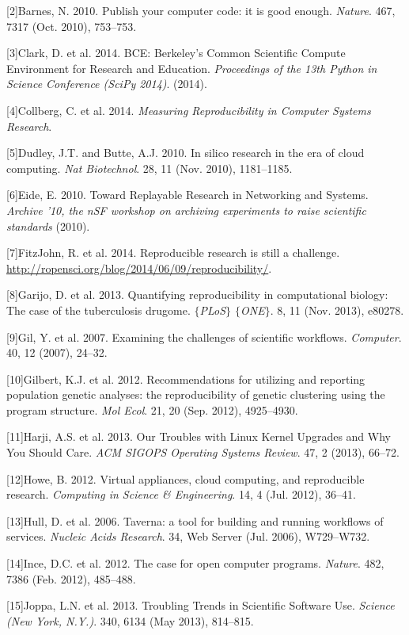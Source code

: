 \documentclass[9pt]{components/acm_proc_article-sp}
\begin{document}
{[}2{]}Barnes, N. 2010. Publish your computer code: it is good enough.
\emph{Nature}. 467, 7317 (Oct. 2010), 753--753.

{[}3{]}Clark, D. et al. 2014. BCE: Berkeley's Common Scientific Compute
Environment for Research and Education. \emph{Proceedings of the 13th
Python in Science Conference (SciPy 2014)}. (2014).

{[}4{]}Collberg, C. et al. 2014. \emph{Measuring Reproducibility in
Computer Systems Research}.

{[}5{]}Dudley, J.T. and Butte, A.J. 2010. In silico research in the era
of cloud computing. \emph{Nat Biotechnol}. 28, 11 (Nov. 2010),
1181--1185.

{[}6{]}Eide, E. 2010. Toward Replayable Research in Networking and
Systems. \emph{Archive '10, the nSF workshop on archiving experiments to
raise scientific standards} (2010).

{[}7{]}FitzJohn, R. et al. 2014. Reproducible research is still a
challenge. \url{http://ropensci.org/blog/2014/06/09/reproducibility/}.

{[}8{]}Garijo, D. et al. 2013. Quantifying reproducibility in
computational biology: The case of the tuberculosis drugome.
\emph{\(\lbrace\)PLoS\(\rbrace\) \(\lbrace\)ONE\(\rbrace\)}. 8, 11 (Nov.
2013), e80278.

{[}9{]}Gil, Y. et al. 2007. Examining the challenges of scientific
workflows. \emph{Computer}. 40, 12 (2007), 24--32.

{[}10{]}Gilbert, K.J. et al. 2012. Recommendations for utilizing and
reporting population genetic analyses: the reproducibility of genetic
clustering using the program structure. \emph{Mol Ecol}. 21, 20 (Sep.
2012), 4925--4930.

{[}11{]}Harji, A.S. et al. 2013. Our Troubles with Linux Kernel Upgrades
and Why You Should Care. \emph{ACM SIGOPS Operating Systems Review}. 47,
2 (2013), 66--72.

{[}12{]}Howe, B. 2012. Virtual appliances, cloud computing, and
reproducible research. \emph{Computing in Science \& Engineering}. 14, 4
(Jul. 2012), 36--41.

{[}13{]}Hull, D. et al. 2006. Taverna: a tool for building and running
workflows of services. \emph{Nucleic Acids Research}. 34, Web Server
(Jul. 2006), W729--W732.

{[}14{]}Ince, D.C. et al. 2012. The case for open computer programs.
\emph{Nature}. 482, 7386 (Feb. 2012), 485--488.

{[}15{]}Joppa, L.N. et al. 2013. Troubling Trends in Scientific Software
Use. \emph{Science (New York, N.Y.)}. 340, 6134 (May 2013), 814--815.
\end{document}
